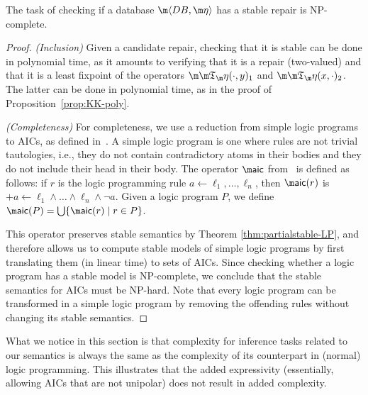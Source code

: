 \begin{proposition}
  The task of checking if a database $\fulldb$ has a stable repair is NP-complete.
\end{proposition}
\begin{proof}
  \emph{(Inclusion)} Given a candidate repair, checking that it is stable can be done in polynomial time, as it amounts to verifying that it is a repair (two-valued) and that it is a least fixpoint of the operators $\Ap(\cdot,y)_1$ and $\Ap(x,\cdot)_2$.
  The latter can be done in polynomial time, as in the proof of Proposition~\ref{prop:KK-poly}.

  \emph{(Completeness)} For completeness, we use a reduction from simple logic programs to AICs, as defined in~\cite{tplp/CaropreseT11}.
  A simple logic program is one where rules are not trivial tautologies, i.e., they do not contain contradictory atoms in their bodies and they do not include their head in their body.
  The operator $\aicop$ from~\cite{tplp/CaropreseT11} is defined as follows: if $r$ is the logic programming rule $a\leftarrow \ell_1,\ldots,\ell_n$, then $\aicop(r)$ is ${+a}\leftarrow \ell_1\wedge\ldots\wedge\ell_n\wedge\neg a$.
  Given a logic program $P$, we define $\aicop(P)=\bigcup\{\aicop(r)\mid r\in P\}$.

  This operator preserves stable semantics by Theorem \ref{thm:partialstable-LP}, and therefore allows us to compute stable models of simple logic programs by first translating them (in linear time) to sets of AICs.
  Since checking whether a logic program has a stable model is NP-complete, we conclude that the stable semantics for AICs must be NP-hard.
  Note that every logic program can be transformed in a simple logic program by removing the offending rules without changing its stable semantics.
\end{proof}

What we notice in this section is that complexity for inference tasks related to our semantics is always the same as the complexity of its counterpart in (normal) logic programming. 
This illustrates that the added expressivity (essentially, allowing AICs that are not unipolar) does not result in added complexity. 





